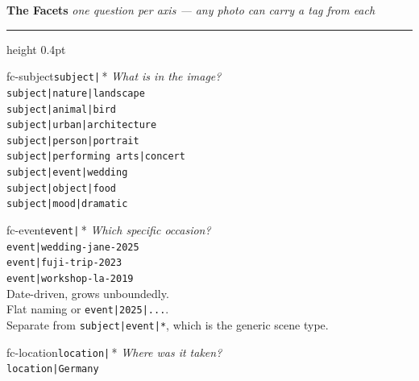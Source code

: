 \documentclass[a3paper,landscape,10pt]{article}
\newcommand{\cmd}[1]{\texttt{\small #1}}
\newcommand{\secthead}[2]{%
  \textcolor{maki-salmon}{\bfseries\normalsize #1}\hspace{1em}%
  \textcolor{maki-stone}{\footnotesize\itshape #2}\\[2pt]%
  {\color{maki-salmon!40}\hrule height 0.4pt}\vspace{6pt}%
}
\begin{document}
\noindent
\begin{minipage}[t]{0.64\textwidth}
  \secthead{The Facets}{one question per axis — any photo can carry a tag from each}

  \noindent
  \begin{minipage}[t]{0.244\textwidth}\begin{facetcard}{fc-subject}{\texttt{subject|}\,*}
    \textit{\small What is in the image?}\\[3pt]
    \scriptsize
    \cmd{subject|nature|landscape}\\
    \cmd{subject|animal|bird}\\
    \cmd{subject|urban|architecture}\\
    \cmd{subject|person|portrait}\\
    \cmd{subject|performing arts|concert}\\
    \cmd{subject|event|wedding}\\
    \cmd{subject|object|food}\\
    \cmd{subject|mood|dramatic}
  \end{facetcard}\end{minipage}\hfill
  \begin{minipage}[t]{0.244\textwidth}\begin{facetcard}{fc-event}{\texttt{event|}\,*}
    \textit{\small Which specific occasion?}\\[3pt]
    \scriptsize
    \cmd{event|wedding-jane-2025}\\
    \cmd{event|fuji-trip-2023}\\
    \cmd{event|workshop-la-2019}\\[2pt]
    {\color{maki-stone} Date-driven, grows unboundedly.\\
    Flat naming or \cmd{event|2025|...}.\\
    Separate from \cmd{subject|event|*},
    which is the generic scene type.}
  \end{facetcard}\end{minipage}\hfill
  \begin{minipage}[t]{0.244\textwidth}\begin{facetcard}{fc-location}{\texttt{location|}\,*}
    \textit{\small Where was it taken?}\\[3pt]
    \scriptsize
    \cmd{location|Germany}\\

\end{facetcard}
\end{minipage}
\end{minipage}
\end{document}

